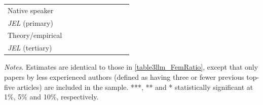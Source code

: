\begin{table}
\begin{threeparttable}
\begin{tabular}{p{3cm}S@{}S@{}S@{}S@{}S@{}S@{}S@{}S@{}S@{}}
            Native speaker                &               &               &               &               &           {}   &           {}   &           {}   &           {}   &           {}   \\
            \textit{JEL} (primary)        &               &               &               &               &               &               &           {}   &               &               \\
            Theory/empirical              &               &               &               &               &               &               &               &           {}   &               \\
            \textit{JEL} (tertiary)       &               &               &               &               &               &               &               &               &           {}   \\
            \bottomrule
        \end{tabular}
        \begin{tablenotes}
            \tiny
            \item \textit{Notes}. Estimates are identical to those in \autoref{table3llm_FemRatio}, except that only papers by less experienced authors (defined as having three or fewer previous top-five articles) are included in the sample. ***, ** and * statistically significant at 1\%, 5\% and 10\%, respectively.
        \end{tablenotes}
    \end{threeparttable}

\end{table}
